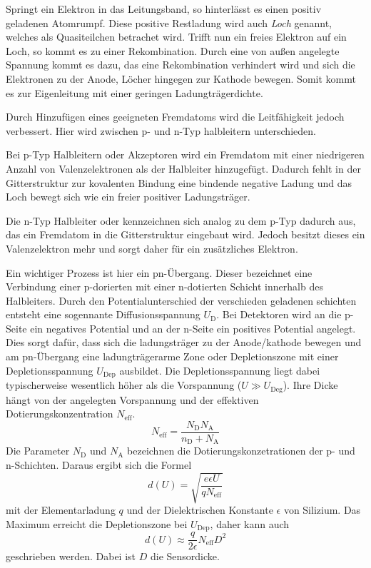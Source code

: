  Springt ein Elektron in das Leitungsband, so hinterlässt es einen positiv
 geladenen Atomrumpf. Diese positive Restladung wird auch \textit{Loch} genannt,
 welches als Quasiteilchen betrachet wird. Trifft nun ein freies Elektron auf ein
 Loch, so kommt es zu einer Rekombination. Durch eine von außen angelegte Spannung
 kommt es dazu, das eine Rekombination verhindert wird und sich die Elektronen
 zu der Anode, Löcher hingegen zur Kathode bewegen. Somit kommt es zur Eigenleitung
 mit einer geringen Ladungträgerdichte.

 Durch Hinzufügen eines geeigneten Fremdatoms wird die Leitfähigkeit jedoch verbessert.
 Hier wird zwischen p- und n-Typ halbleitern unterschieden.

 Bei p-Typ Halbleitern oder Akzeptoren wird ein Fremdatom mit einer niedrigeren
 Anzahl von Valenzelektronen als der Halbleiter
 hinzugefügt. Dadurch fehlt in der Gitterstruktur zur kovalenten
 Bindung eine bindende negative Ladung und das Loch bewegt sich wie ein freier
 positiver Ladungsträger.

 Die n-Typ Halbleiter oder kennzeichnen sich analog zu dem p-Typ dadurch aus, das ein
 Fremdatom in die Gitterstruktur eingebaut wird. Jedoch besitzt dieses ein
 Valenzelektron mehr und sorgt daher für ein zusätzliches Elektron.

 Ein wichtiger Prozess ist hier ein pn-Übergang. Dieser bezeichnet eine Verbindung
 einer p-dorierten mit einer n-dotierten Schicht innerhalb des Halbleiters. Durch den
 Potentialunterschied der verschieden geladenen schichten entsteht eine sogennante
 Diffusionsspannung $U_\text{D}$. Bei Detektoren wird an die p-Seite ein negatives
 Potential und an der n-Seite ein positives Potential angelegt. Dies sorgt dafür,
 dass sich die ladungsträger zu der Anode/kathode bewegen und am pn-Übergang eine
 ladungträgerarme Zone oder Depletionszone mit einer Depletionsspannung $U_\text{Dep}$
 ausbildet. Die Depletionsspannung liegt dabei typischerweise wesentlich höher als die
 Vorspannung ($U \gg U_\text{Deg}$). Ihre Dicke hängt von der
 angelegten Vorspannung und der effektiven Dotierungskonzentration $N_\text{eff}$.
 \begin{equation}
   N_\text{eff} = \frac{N_\text{D}N_\text{A}}{n_\text{D}+N_\text{A}}
 \end{equation}
Die Parameter $N_\text{D}$ und $N_\text{A}$ bezeichnen die Dotierungskonzetrationen
der p- und n-Schichten.
Daraus ergibt sich die Formel
\begin{equation}
  d(U) = \sqrt{\frac{e\epsilon U}{q N_\text{eff}}}
\end{equation}
mit der Elementarladung $q$ und der Dielektrischen Konstante $\epsilon$ von
Silizium. Das Maximum erreicht die Depletionszone bei $U_\text{Dep}$, daher kann
auch
\begin{equation}
  d(U) \approx \frac{q}{2\epsilon} N_\text{eff}D^2
\end{equation}
geschrieben werden. Dabei ist $D$ die Sensordicke.


